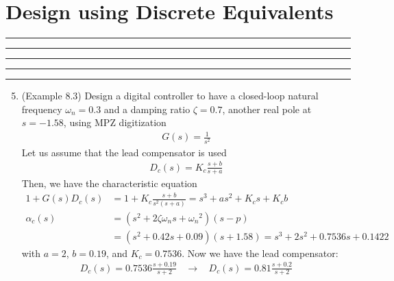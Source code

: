 \setcounter{chapter}{7}
\setcounter{section}{2}
\section{Design using Discrete Equivalents}
\vspace{-8pt} \hrule \hrule \hrule \hrule \hrule  \vspace{12pt}
\begin{enumerate}
	\setcounter{enumi}{4}
		\item (Example 8.3) Design a digital controller to have a closed-loop natural frequency $\omega_n = 0.3$ and a damping ratio $\zeta = 0.7$, another real pole at $s=-1.58$, using MPZ digitization
		\begin{align*}
			G(s) = \frac{1}{s^2}
		\end{align*}
		Let us assume that the lead compensator is used
		\begin{align*}
			D_c(s) = K_c \frac{s+b}{s+a} 
		\end{align*}
		Then, we have the characteristic equation
		\begin{align*}
			1+G(s) D_c(s) &= 1 + K_c \frac{s+b}{s^2(s+a)}  = s^3 + as^2 + K_c s + K_c b \\
			\alpha_c(s) &= (s^2 + 2 \zeta \omega_n s + {\omega_n }^2)(s- p)\\
						&= (s^2 + 0.42s + 0.09)(s+1.58) = s^3 + 2s^2 + 0.7536s + 0.1422
		\end{align*}
	    with $a=2$, $b=0.19$, and $K_c = 0.7536$. Now we have the lead compensator: 
		\begin{align*}
			D_c(s) = 0.7536 \frac{s+0.19}{s+2} ~~~~\rightarrow~~~~
			D_c(s) = 0.81 \frac{s+0.2}{s+2}
		\end{align*}

	\end{enumerate}